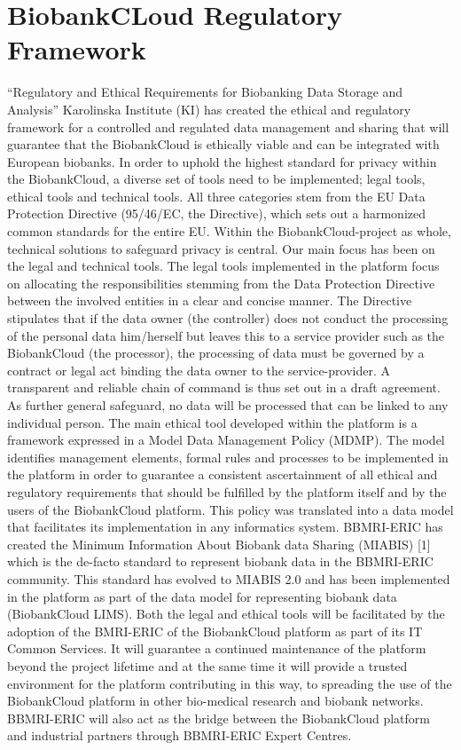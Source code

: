 \section{BiobankCLoud Regulatory Framework}

“Regulatory and Ethical Requirements for Biobanking Data Storage and Analysis”
Karolinska Institute (KI) has created the ethical and regulatory framework for a controlled and regulated data management and sharing that will guarantee that the BiobankCloud is ethically viable and can be integrated with European biobanks. In order to uphold the highest standard for privacy within the BiobankCloud, a diverse set of tools need to be implemented; legal tools, ethical tools and technical tools. All three categories stem from the EU Data Protection Directive (95/46/EC, the Directive), which sets out a harmonized common standards for the entire EU. Within the BiobankCloud-project as whole, technical solutions to safeguard privacy is central. Our main focus has been on the legal and technical tools. 
The legal tools implemented in the platform focus on allocating the responsibilities stemming from the Data Protection Directive between the involved entities in a clear and concise manner.  The Directive stipulates that if the data owner (the controller) does not conduct the processing of the personal data him/herself but leaves this to a service provider such as the BiobankCloud (the processor), the processing of data must be governed by a contract or legal act binding the data owner to the service-provider. A transparent and reliable chain of command is thus set out in a draft agreement.  As further general safeguard, no data will be processed that can be linked to any individual person.
The main ethical tool developed within the platform is a framework expressed in a Model Data Management Policy (MDMP). The model identifies management elements, formal rules and processes to be implemented in the platform in order to guarantee a consistent ascertainment of all ethical and regulatory requirements that should be fulfilled by the platform itself and by the users of the BiobankCloud platform. This policy was translated into a data model that facilitates its implementation in any informatics system. 
BBMRI-ERIC has created the Minimum Information About Biobank data Sharing (MIABIS) [1] which is the de-facto standard to represent biobank data in the BBMRI-ERIC community. This standard has evolved to MIABIS 2.0 and has been implemented in the platform as part of the data model for representing biobank data (BiobankCloud LIMS). 
Both the legal and ethical tools will be facilitated by the adoption of the BMRI-ERIC of the BiobankCloud platform as part of its IT Common Services. It will guarantee a continued maintenance of the platform beyond the project lifetime and at the same time it will provide a trusted environment for the platform contributing in this way, to spreading the use of the BiobankCloud platform in other bio-medical research and biobank networks. BBMRI-ERIC will also act as the bridge between the BiobankCloud platform and industrial partners through BBMRI-ERIC Expert Centres. 
